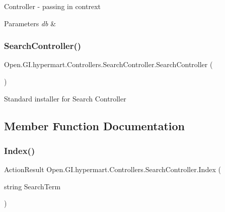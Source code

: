 Controller -\/ passing in contrext 


\begin{DoxyParams}{Parameters}
{\em db} & \\
\hline
\end{DoxyParams}
\hypertarget{class_open_1_1_g_i_1_1hypermart_1_1_controllers_1_1_search_controller_a8bd1641a18d5720e47a17e91e8957977}{}\label{class_open_1_1_g_i_1_1hypermart_1_1_controllers_1_1_search_controller_a8bd1641a18d5720e47a17e91e8957977} 
\subsubsection{\texorpdfstring{Search\+Controller()}{SearchController()}\hspace{0.1cm}{\footnotesize\ttfamily [2/2]}}
{\footnotesize\ttfamily Open.\+G\+I.\+hypermart.\+Controllers.\+Search\+Controller.\+Search\+Controller (\begin{DoxyParamCaption}{ }\end{DoxyParamCaption})}



Standard installer for Search Controller 



\subsection{Member Function Documentation}
\hypertarget{class_open_1_1_g_i_1_1hypermart_1_1_controllers_1_1_search_controller_a92174a9db0c7ca485afd0c513ad8f66d}{}\label{class_open_1_1_g_i_1_1hypermart_1_1_controllers_1_1_search_controller_a92174a9db0c7ca485afd0c513ad8f66d} 
\subsubsection{\texorpdfstring{Index()}{Index()}}
{\footnotesize\ttfamily Action\+Result Open.\+G\+I.\+hypermart.\+Controllers.\+Search\+Controller.\+Index (\begin{DoxyParamCaption}\item[{string}]{Search\+Term }\end{DoxyParamCaption})}




